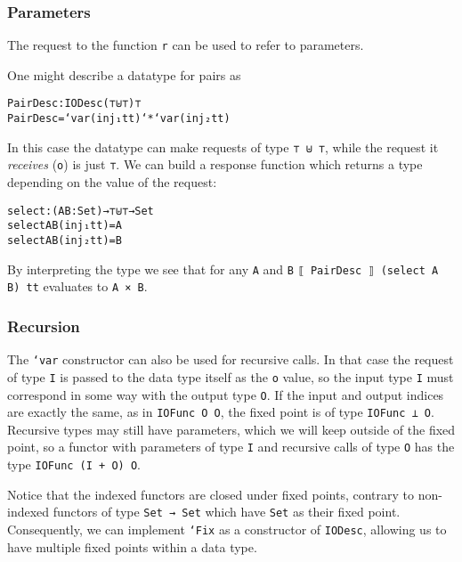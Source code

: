 \subsubsection{Parameters}

The request to the function \texttt{r} can be used to refer to
parameters.

\begin{example}
One might describe a datatype for pairs as

\begin{alltt}
PairDesc : IODesc (⊤ ⊎ ⊤) ⊤
PairDesc = `var (inj₁ tt) `* `var (inj₂ tt)
\end{alltt}

In this case the datatype can make requests of type \texttt{⊤ ⊎ ⊤},
while the request it \emph{receives} (\texttt{o}) is just \texttt{⊤}.
We can build a response function which returns a type depending on the
value of the request:

\begin{alltt}
select : (A B : Set) → ⊤ ⊎ ⊤ → Set
select A B (inj₁ tt) = A
select A B (inj₂ tt) = B
\end{alltt}

By interpreting the type we see that for any \texttt{A} and \texttt{B}
\texttt{⟦ PairDesc ⟧ (select A B) tt} evaluates to \texttt{A × B}.
\end{example}

\subsubsection{Recursion}

The \texttt{`var} constructor can also be used for recursive calls.
In that case the request of type \texttt{I} is passed to the data type
itself as the \texttt{o} value, so the input type \texttt{I} must
correspond in some way with the output type \texttt{O}.
If the input and output indices are exactly the same, as in
\texttt{IOFunc O O}, the fixed point is of type \texttt{IOFunc ⊥ O}.
Recursive types may still have parameters, which we will keep outside
of the fixed point, so a functor with parameters of type \texttt{I}
and recursive calls of type \texttt{O} has the type \texttt{IOFunc (I
  + O) O}.

Notice that the indexed functors are closed under fixed points,
contrary to non-indexed functors of type \texttt{Set → Set} which have
\texttt{Set} as their fixed point.
Consequently, we can implement \texttt{`Fix} as a constructor of
\texttt{IODesc}, allowing us to have multiple fixed points within a
data type.

